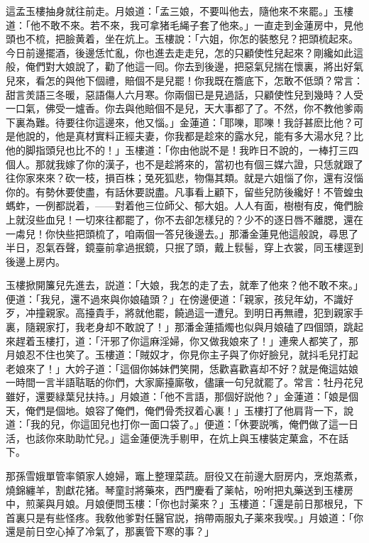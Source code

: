 這孟玉樓抽身就往前走。月娘道：「孟三娘，不要叫他去，隨他來不來罷。」玉樓道：「他不敢不來。若不來，我可拿猪毛䋲子套了他來。」一直走到金蓮房中，見他頭也不梳，把臉黄着，坐在炕上。玉樓說：「六姐，你怎的裝憨兒？把頭梳起來。今日前邊擺酒，後邊恁忙亂，你也進去走走兒，怎的只顧使性兒起來？剛纔如此這般，俺們對大娘說了，勸了他這一囘。你去到後邊，把惡氣兒揣在懷裏，將出好氣兒來，看怎的與他下個禮，賠個不是兒罷！你我既在簷底下，怎敢不低頭？常言：甜言羙語三冬暖，惡語傷人六月寒。你兩個已是見過話，只顧使性兒到幾時？人受一口氣，佛受一爐香。你去與他賠個不是兒，天大事都了了。不然，你不教他爹兩下裏為難。待要往你這邊來，他又惱。」金蓮道：「耶嚛，耶嚛！我㧱甚麽比他？可是他說的，他是真材實料正經夫妻，你我都是趁來的露水兒，能有多大湯水兒？比他的脚指頭兒也比不的！」玉樓道：「你由他説不是！我昨日不說的，一棒打三四個人。那就我嫁了你的漢子，也不是趁將來的，當初也有個三媒六證，只恁就跟了往你家來來？砍一枝，損百株；兔死狐悲，物傷其類。就是六姐惱了你，還有沒惱你的。有勢休要使盡，有話休要説盡。凡事看上顧下，留些兒防後纔好！不管蝗虫螞蚱，一例都説着，——對着他三位師父、郁大姐。人人有面，樹樹有皮，俺們臉上就沒些血兒！一切來往都罷了，你不去卻怎樣兒的？少不的逐日唇不離腮，還在一䖏兒！你快些把頭梳了，咱兩個一答兒後邊去。」那潘金蓮見他這般說，尋思了半日，忍氣吞聲，鏡臺前拿過抿鏡，只抿了頭，戴上䯼髻，穿上衣裳，同玉樓逕到後邊上房内。

玉樓掀開簾兒先進去，説道：「大娘，我怎的走了去，就牽了他來？他不敢不來。」便道：「我兒，還不過來與你娘磕頭？」在傍邊便道：「親家，孩兒年幼，不識好歹，冲撞親家。高擡貴手，將就他罷，饒過這一遭兒。到明日再無禮，犯到親家手裏，隨親家打，我老身却不敢說了！」那潘金蓮插燭也似與月娘磕了四個頭，跳起來趕着玉樓打，道：「汗邪了你這麻淫婦，你又做我娘來了！」連衆人都笑了，那月娘忍不住也笑了。玉樓道：「賊奴才，你見你主子與了你好臉兒，就抖毛兒打起老娘來了！」大妗子道：「這個你姊妹們笑開，恁歡喜歡喜却不好？就是俺這姑娘一時間一言半語聐聒的你們，大家廝擡廝敬，儘讓一句兒就罷了。常言：牡丹花兒雖好，還要緑葉兒扶持。」月娘道：「他不言語，那個好説他？」金蓮道：「娘是個天，俺們是個地。娘容了俺們，俺們骨秃扠着心裏！」玉樓打了他肩背一下，說道：「我的兒，你這囬兒也打你一面口袋了。」便道：「休要説嘴，俺們做了這一日活，也該你來助助忙兒。」這金蓮便洗手剔甲，在炕上與玉樓裝定菓盒，不在話下。

那孫雪娥單管率領家人媳婦，竈上整理菜蔬。厨役又在前邊大厨房内，烹炮蒸煮，燒錦纏羊，割獻花猪。琴童討將藥來，西門慶看了薬帖，吩咐把丸藥送到玉樓房中，煎薬與月娘。月娘便問玉樓：「你也討薬來？」玉樓道：「還是前日那根兒，下首裏只是有些怪疼。我敎他爹對任醫官説，捎帶兩服丸子薬來我喫。」月娘道：「你還是前日空心掉了冷氣了，那裏管下寒的事？」

